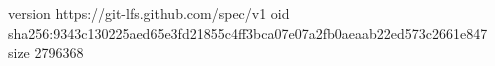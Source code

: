 version https://git-lfs.github.com/spec/v1
oid sha256:9343c130225aed65e3fd21855c4ff3bca07e07a2fb0aeaab22ed573c2661e847
size 2796368
